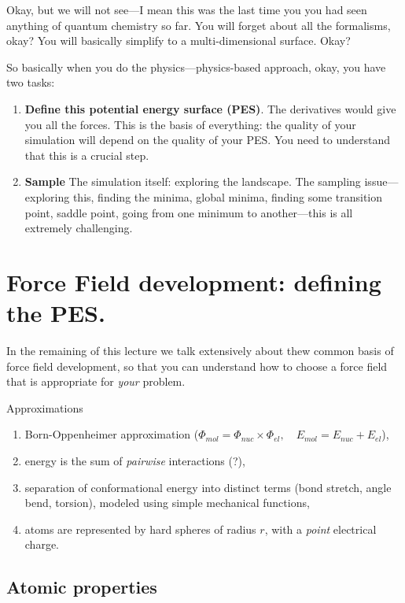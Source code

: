 Okay, but we will not see—I mean this was the last time you you had seen anything of quantum chemistry so far. You will forget about all the formalisms, okay? You will basically simplify to a multi-dimensional surface. Okay? 


So basically when you do the physics—physics-based approach, okay, you have two tasks: 

\begin{enumerate}
\item \textbf{Define this potential energy surface (PES)}. The derivatives would give you all the forces. This is the basis of everything: the quality of your simulation will depend on the quality of your PES. You need to understand that this is a crucial step.
\item  \textbf{Sample} The simulation itself: exploring the landscape. The sampling issue—exploring this, finding the minima, global minima, finding some transition point, saddle point, going from one minimum to another—this is all extremely challenging.
\end{enumerate}



\section{Force Field development: defining the PES.}
In the remaining of this lecture we talk extensively about thew common basis of force field development, so that you can understand
how to choose a force field that is appropriate for \textit{your} problem.

Approximations
\begin{enumerate}
    \item Born-Oppenheimer approximation ($\Phi _{mol} = \Phi_{nuc}\times \Phi_{el}, \quad E_{mol} = E_{nuc} + E_{el}$),
    \item energy is the sum of \textit{pairwise} interactions (?),
    \item separation of conformational energy into distinct terms (bond stretch, angle bend, torsion), modeled using simple mechanical functions,
    \item atoms are represented by hard spheres of radius $r$, with a \textit{point} electrical charge.
\end{enumerate}


\subsection{Atomic properties}

